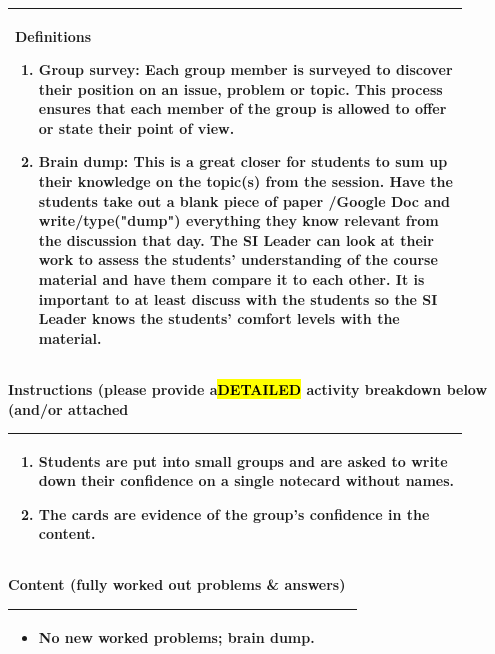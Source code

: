 \documentclass{article}
\begin{document}
{{\vspace{0.5cm}
\noindent
\begin{tabular}{|p{0.9\linewidth}|}
\hline
{\large\textbf{Definitions}}
\begin{enumerate}
   \item\textbf{Group survey:} Each group member is surveyed to discover their position on an issue, problem or topic. This process ensures that each member of the group is allowed to offer or state their point of view.
   \item\textbf{Brain dump:} This is a great closer for students to sum up their knowledge on the topic(s) from the session. Have the students take out a blank piece of paper /Google Doc and write/type("dump") everything they know relevant from the discussion that day. The SI Leader can look at their work to assess the students' understanding of the course material and have them compare it to each other. It is important to at least discuss with the students so the SI Leader knows the students' comfort levels with the material. 
\end{enumerate}
\\ \hline
\end{tabular}

\newpage
\noindent
{\large\textbf{Instructions (please provide a\hl{DETAILED} activity breakdown below (and/or attached}}

\begin{tabular}{|p{0.9\linewidth}|}
\hline
\begin{enumerate}[itemsep=0.3em]
   \item Students are put into small groups and are asked to write down their confidence on a single notecard without names.
   \item The cards are evidence of the group's confidence in the content.
\end{enumerate}
\\ \hline
\end{tabular}

\vspace{0.5cm}
\noindent
{\large\textbf{Content (fully worked out problems \& answers)}

\begin{tabular}{|p{0.9\linewidth}|}
\hline
\begin{itemize}
   \item No new worked problems; brain dump.
\end{itemize}
\\ \hline
\end{tabular}

}}}
\end{document}
